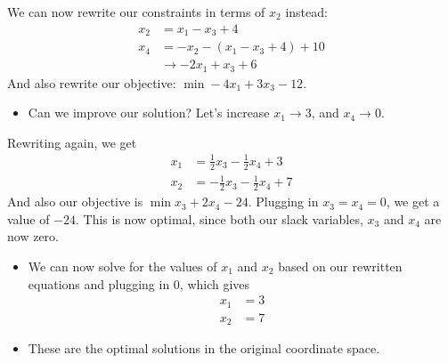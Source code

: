 \documentclass[10pt]{article}
\begin{document}
We can now rewrite our constraints in terms of $x_2$ instead:
\begin{align*}
    x_2 &= x_1 - x_3 + 4\\
    x_4 &= -x_2 - (x_1 - x_3 + 4) + 10 \\
    &\rightarrow -2x_1 + x_3 + 6
\end{align*}
And also rewrite our objective: $\min -4x_1 + 3x_3 - 12$.
\begin{itemize}
	\item Can we improve our solution?  Let's increase $x_1 \rightarrow 3$, and $x_4 \rightarrow 0$. 
\end{itemize}
Rewriting again, we get
\begin{align*}
    x_1 &= \frac{1}{2} x_3 - \frac{1}{2} x_4 + 3\\
    x_2 &= -\frac{1}{2} x_3 - \frac{1}{2} x_4 + 7
\end{align*}
And also our objective is $\min x_3 + 2x_4 - 24$.  Plugging in $x_3 = x_4 = 0$, we get a value of $-24$.  This is now optimal, since both our slack variables, $x_3$ and $x_4$ are now zero.
\begin{itemize}
	\item We can now solve for the values of $x_1$ and $x_2$ based on our rewritten equations and plugging in $0$, which gives 
	\begin{align*}
        x_1 &= 3 \\
        x_2 &= 7
    \end{align*}
    \item These are the optimal solutions in the original coordinate space.
\end{itemize}
\end{document}
